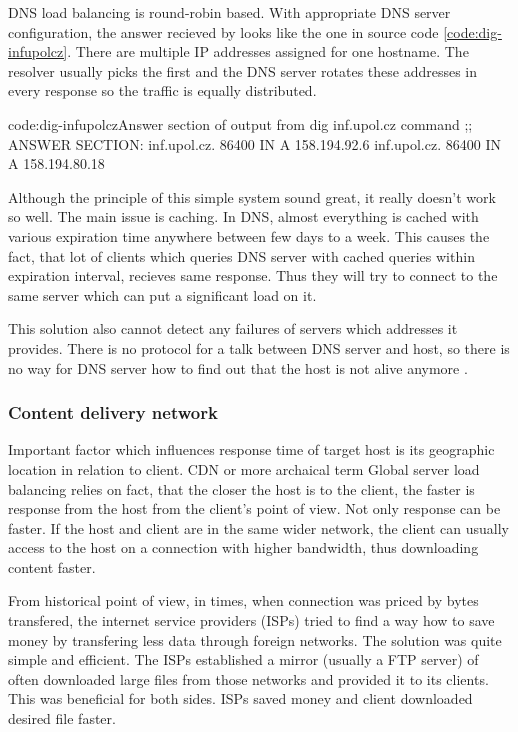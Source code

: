 \documentclass[
  master,
  biblatex,
  glossaries,
  index
]{kidiplom}
\begin{document}
DNS load balancing is round-robin based. With appropriate DNS server configuration, the answer recieved by  looks like the one in source code \ref{code:dig-infupolcz}. There are multiple IP addresses assigned for one hostname. The resolver usually picks the first and the DNS server rotates these addresses in every response so the traffic is equally distributed.

\begin{kicode}{}{code:dig-infupolcz}{Answer section of output from dig inf.upol.cz command}
;; ANSWER SECTION:
inf.upol.cz.		86400	IN	A	158.194.92.6
inf.upol.cz.		86400	IN	A	158.194.80.18
\end{kicode}

Although the principle of this simple system sound great, it really doesn't work so well. The main issue is caching. In DNS, almost everything is cached with various expiration time anywhere between few days to a week. This causes the fact, that lot of clients which queries DNS server with cached queries within expiration interval, recieves same response. Thus they will try to connect to the same server which can put a significant load on it.

This solution also cannot detect any failures of servers which addresses it provides. There is no protocol for a talk between DNS server and host, so there is no way for DNS server how to find out that the host is not alive anymore \cite{bib:slb}\cite{bib:practicallb}.

\subsubsection{Content delivery network}

Important factor which influences response time of target host is its geographic location in relation to client. CDN or more archaical term Global server load balancing\cite{bib:slb} relies on fact, that the closer the host is to the client, the faster is response from the host from the client's point of view. Not only response can be faster. If the host and client are in the same wider network, the client can usually access to the host on a connection with higher bandwidth, thus downloading content faster\cite{bib:practicallb}.

From historical point of view, in times, when connection was priced by bytes transfered, the internet service providers (ISPs) tried to find a way how to save money by transfering less data through foreign networks. The solution was quite simple and efficient. The ISPs established a mirror (usually a FTP server) of often downloaded large files from those networks and provided it to its clients. This was beneficial for both sides. ISPs saved money and client downloaded desired file faster.
\end{document}
